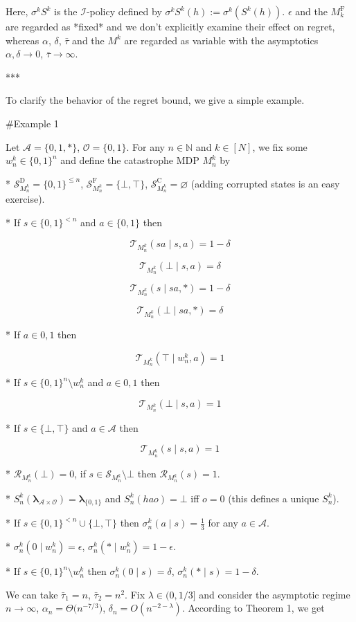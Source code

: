 \documentclass[a4paper]{article}
\newcommand{\Bool}{\{0,1\}}
\newcommand{\AP}[1]{\left(#1\right)}
\newcommand{\Nats}{\mathbb{N}}
\newcommand{\Estr}{\boldsymbol{\lambda}}
\newcommand{\Ob}{\mathcal{O}}
\newcommand{\A}{\mathcal{A}}
\newcommand{\St}{\mathcal{S}}
\newcommand{\T}{\mathcal{T}}
\newcommand{\R}{\mathcal{R}}
\newcommand{\In}{\mathcal{I}}
\newcommand{\RMC}{\mathrm{C}}
\newcommand{\RMD}{\mathrm{D}}
\newcommand{\RMF}{\mathrm{F}}
\newcommand{\SF}{\St^{\RMF}}
\newcommand{\SD}{\St^{\RMD}}
\newcommand{\SC}{\St^{\RMC}}
\newcommand{\MF}{M^{\RMF}}
\begin{document}
Here, $\sigma^k S^k$ is the $\In$-policy defined by $\sigma^k S^k(h):=\sigma^k\AP{S^k(h)}$. $\epsilon$ and the $\MF_k$ are regarded as *fixed* and we don't explicitly examine their effect on regret, whereas $\alpha$, $\delta$, $\bar{\tau}$ and the $M^k$ are regarded as variable with the asymptotics $\alpha,\delta \rightarrow 0$, $\bar{\tau} \rightarrow \infty$.

***

To clarify the behavior of the regret bound, we give a simple example.

\#Example 1

Let $\A = \{0,1,*\}$, $\Ob=\Bool$. For any $n \in \Nats$ and $k \in [N]$, we fix some $w_n^k \in \Bool^n$ and define the catastrophe MDP $M_n^k$ by

* $\SD_{M_n^k} = \Bool^{\leq n}$, $\SF_{M_n^k} = \{\bot,\top\}$, $\SC_{M_n^k} = \varnothing$ (adding corrupted states is an easy exercise).

* If $s \in \Bool^{< n}$ and $a \in \Bool$ then 

$$\T_{M_n^k}(sa \mid s,a) = 1 - \delta$$

$$\T_{M_n^k}(\bot \mid s,a) = \delta$$

$$\T_{M_n^k}(s \mid sa,*) = 1 - \delta$$

$$\T_{M_n^k}(\bot \mid sa,*) = \delta$$

* If $a \in {0,1}$ then

$$\T_{M_n^k}(\top \mid w_n^k,a) = 1$$

* If $s \in \Bool^n \setminus w_n^k$ and $a \in {0,1}$ then

$$\T_{M_n^k}(\bot \mid s,a) = 1$$

* If $s \in \{\bot,\top\}$ and $a \in \A$ then

$$\T_{M_n^k}(s \mid s,a) = 1$$

* $\R_{M_n^k}(\bot)=0$, if $s \in \St_{M_n^k} \setminus \bot$ then $\R_{M_n^k}(s)=1$.

* $S_n^k(\Estr_{\A \times \Ob})=\Estr_{\Bool}$ and $S_n^k(hao)=\bot$ iff $o = 0$ (this defines a unique $S_n^k$).

* If $s \in \Bool^{<n} \cup \{\bot,\top\}$ then $\sigma_n^k(a \mid s) = \frac{1}{3}$ for any $a \in \A$.

* $\sigma_n^k(0 \mid w_n^k) = \epsilon$, $\sigma_n^k(* \mid w_n^k) = 1 - \epsilon$.

* If $s \in \Bool^n \setminus w_n^k$ then $\sigma_n^k(0 \mid s) = \delta$, $\sigma_n^k(* \mid s) = 1 - \delta$.

We can take $\bar{\tau}_1 = n$, $\bar{\tau}_2 = n^2$. Fix $\lambda \in (0,1/3]$ and consider the asymptotic regime $n \rightarrow \infty$, $\alpha_n = \Theta\Big(n^{-7/3}\Big)$, $\delta_n = O\AP{n^{-2-\lambda}}$. According to Theorem 1, we get
\end{document}
